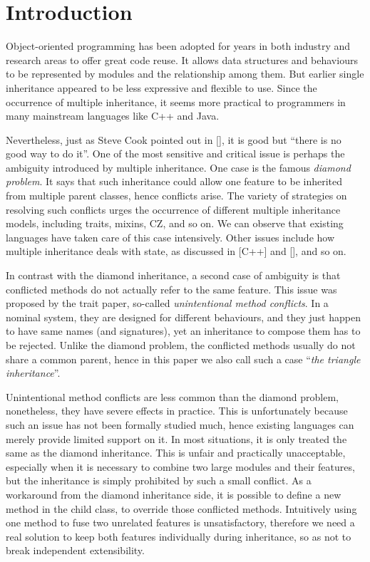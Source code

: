 \section{Introduction}

Object-oriented programming has been adopted for years in both industry and research areas to offer great code reuse.
It allows data structures and behaviours to be represented by modules and the relationship among them. But earlier
single inheritance appeared to be less expressive and flexible to use. Since the occurrence of multiple inheritance, it
seems more practical to programmers in many mainstream languages like C++ and Java.

Nevertheless, just as Steve Cook pointed out
in [], it is good but ``there is no good way to do it''.
One of the most sensitive and critical issue is perhaps the ambiguity introduced by multiple inheritance.
One case is the famous \textit{diamond problem}. It says that such inheritance could allow one feature to be inherited from
multiple parent classes, hence conflicts arise. The variety of strategies on resolving such conflicts urges the occurrence of
different multiple inheritance models, including traits, mixins, CZ, and so on. We can observe that existing languages have taken
care of this case intensively. Other issues include how multiple inheritance
deals with state, as discussed in [C++] and [], and so on.

In contrast with the diamond inheritance, a second case of ambiguity is that conflicted methods do not actually refer to the same feature.
This issue was proposed by the trait paper, so-called \textit{unintentional method conflicts}. In a nominal system, they are designed
for different behaviours, and they just happen to have same names (and signatures),
yet an inheritance to compose them has to be rejected. Unlike the
diamond problem, the conflicted methods usually do not share a common parent, hence in this paper we also call such a case ``\textit{the triangle
inheritance}''.

Unintentional method conflicts are less common than the diamond problem, nonetheless, they have severe effects in practice. This
is unfortunately because such an issue has not been formally studied much, hence existing languages can merely provide limited support on it.
In most situations, it is only treated the same as the diamond inheritance. This is unfair and practically unacceptable, especially when it is
necessary to combine two large modules and their features, but the inheritance is simply prohibited by such a small conflict. As a workaround from the diamond inheritance side, it is possible to define a new method in the child class, to override those conflicted methods. Intuitively using one method to fuse two unrelated features is unsatisfactory, therefore we need a real solution to keep both features individually during inheritance,
so as not to break independent extensibility.

